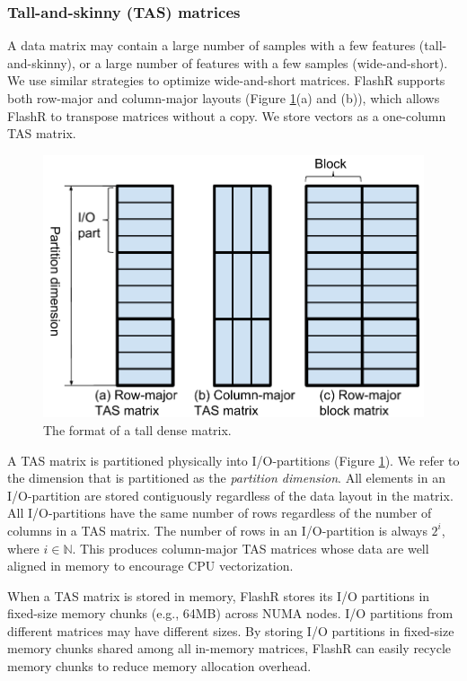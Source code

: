 \subsubsection{Tall-and-skinny (TAS) matrices}
A data matrix may contain a large number of samples with a few features
(tall-and-skinny),
or a large number of features with a few samples (wide-and-short).
We use similar strategies to optimize wide-and-short matrices. FlashR
supports both row-major and column-major layouts (Figure \ref{fig:den_mat}(a)
and (b)), which allows FlashR to transpose matrices without a copy.
We store vectors as a one-column TAS matrix.

\begin{figure}
	\centering
	\includegraphics[scale=0.5]{FlashMatrix_figs/dense_matrix2.pdf}
	\vspace{-5pt}
	\caption{The format of a tall dense matrix.}
	\label{fig:den_mat}
  \vspace{-12pt}
\end{figure}

A TAS matrix is partitioned physically into I/O-partitions (Figure
\ref{fig:den_mat}). We refer to the dimension that is partitioned as
the \textit{partition dimension}. All elements in an I/O-partition are stored
contiguously regardless of the data layout in the matrix. All I/O-partitions
have the same number of rows regardless of the number of columns in a TAS
matrix. The number of rows in an I/O-partition is always $2^i$, where
$i \in \mathbb{N}$. This produces column-major TAS
matrices whose data are well aligned in memory to encourage CPU vectorization.

When a TAS matrix is stored in memory, FlashR stores its I/O partitions in
fixed-size memory chunks (e.g., 64MB) across NUMA nodes.
I/O partitions from different matrices may have different sizes. By storing
I/O partitions in fixed-size memory chunks shared among all in-memory matrices,
FlashR can easily recycle memory chunks to reduce memory allocation overhead.

